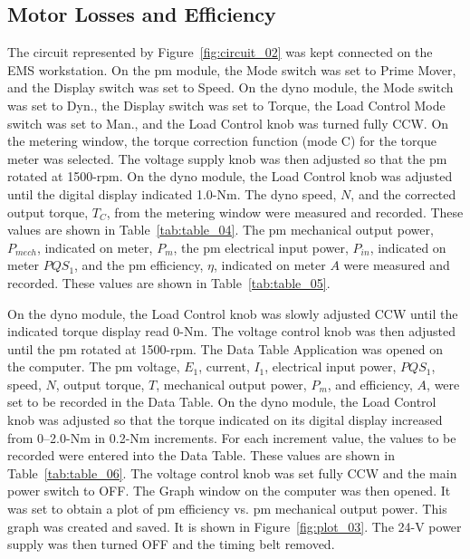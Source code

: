 \documentclass{article}
\begin{document}
\subsection{Motor Losses and Efficiency}

\label{part3} The circuit represented by Figure~\ref{fig:circuit_02} was kept
connected on the EMS workstation.  On the \gls{pm} module, the Mode switch was
set to Prime Mover, and the Display switch was set to Speed. On the \gls{dyno}
module, the Mode switch was set to Dyn., the Display switch was set to Torque,
the Load Control Mode switch was set to Man., and the Load Control knob was
turned fully {CCW}. On the metering window, the torque correction function
(mode C) for the torque meter was selected. The voltage supply knob was then
adjusted so that the \gls{pm} rotated at 1500-rpm. On the \gls{dyno} module,
the Load Control knob was adjusted until the digital display indicated 1.0-Nm.
The \gls{dyno} speed, $N$, and the corrected output torque, $T_C$, from the
metering window were measured and recorded. These values are shown in
Table~\ref{tab:table_04}. The \gls{pm} mechanical output power, $P_{mech}$,
indicated on meter, $P_m$, the \gls{pm} electrical input power, $P_{in}$,
indicated on meter $PQS_1$, and the \gls{pm} efficiency, $\eta$, indicated on
meter $A$ were measured and recorded. These values are shown in
Table~\ref{tab:table_05}.

On the \gls{dyno} module, the Load Control knob was slowly adjusted CCW until
the indicated torque display read 0-Nm. The voltage control knob was then
adjusted until the \gls{pm} rotated at 1500-rpm. The Data Table Application was
opened on the computer. The \gls{pm} voltage, $E_1$, current, $I_1$, electrical
input power, $PQS_1$, speed, $N$, output torque, $T$, mechanical output power,
$P_{m}$, and efficiency, $A$, were set to be recorded in the Data Table. On the
\gls{dyno} module, the Load Control knob was adjusted so that the torque
indicated on its digital display increased from 0--2.0-Nm in 0.2-Nm increments.
For each increment value, the values to be recorded were entered into the Data
Table.  These values are shown in Table~\ref{tab:table_06}. The voltage control
knob was set fully CCW and the main power switch to {OFF}. The Graph window on
the computer was then opened. It was set to obtain a plot of \gls{pm}
efficiency vs. \gls{pm} mechanical output power. This graph was created and
saved. It is shown in Figure~\ref{fig:plot_03}. The 24-V power supply was then
turned OFF and the timing belt removed.
\end{document}
